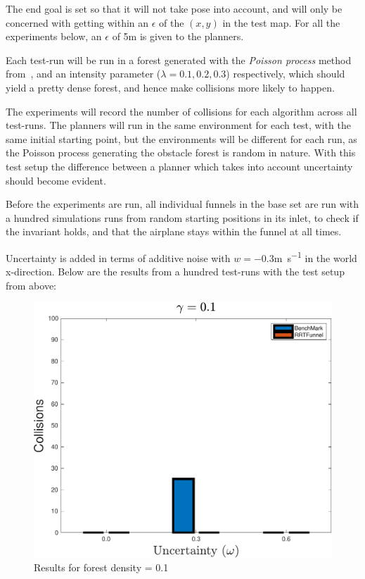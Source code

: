 The end goal is set so that it will not take pose into account, and will only be
concerned with getting within an \(\epsilon\) of the \((x,y)\) in the test map.
For all the experiments below, an \(\epsilon\) of 5\si{\metre} is given to the
planners.

Each test-run will be run in a forest generated with the \textit{Poisson
  process} method from~, and an intensity parameter
(\(\lambda = 0.1,0.2,0.3\)) respectively, which should yield a pretty dense
forest, and hence make collisions more likely to happen.

The experiments will record the number of collisions for each algorithm across
all test-runs. The planners will run in the same environment for each test, with
the same initial starting point, but the environments will be different for each
run, as the Poisson process generating the obstacle forest is random in nature.
With this test setup the difference between a planner which takes into account
uncertainty should become evident.

Before the experiments are run, all individual funnels in the base set are run
with a hundred simulations runs from random starting positions in its inlet, to
check if the invariant holds, and that the airplane stays within the funnel at
all times. 

Uncertainty is added in terms of additive noise with \(w = -0.3\)\si{m.s^{-1}}
in the world x-direction. Below are the results from a hundred test-runs with
the test setup from above:

\begin{figure}
  \centering \includegraphics[width=\textwidth]{figures/experiments/ResultPlot01}
  \caption{Results for forest density = 0.1}
  \label{fig:result0.1}
\end{figure}

